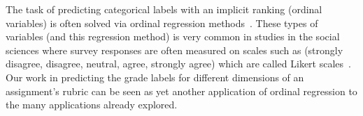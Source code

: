 The task of predicting categorical labels with an implicit ranking (ordinal
variables) is often solved via ordinal regression
methods~\cite{McCullagh:1980}. These types of variables (and this
regression method) is very common in studies in the social sciences where
survey responses are often measured on scales such as (strongly disagree,
disagree, neutral, agree, strongly agree) which are called Likert
scales~\cite{Likert:1932}. Our work in predicting the grade labels for
different dimensions of an assignment's rubric can be seen as yet another
application of ordinal regression to the many applications already
explored.
